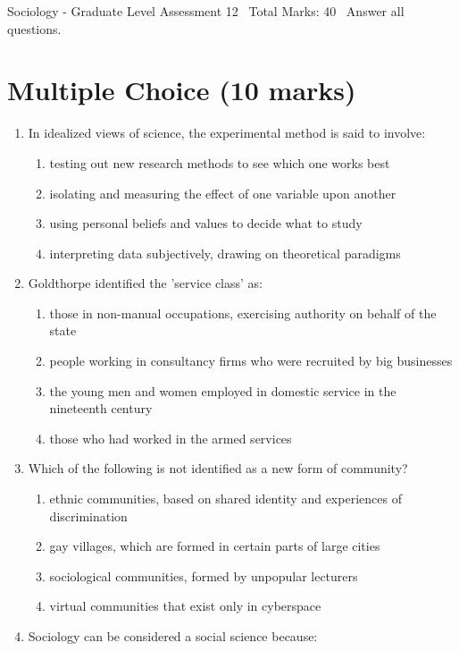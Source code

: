 \documentclass[12pt]{article}
\begin{document}
\begin{center}
Sociology - Graduate Level Assessment 12 \
Total Marks: 40 \
Answer all questions.
\end{center}

\section*{Multiple Choice (10 marks)}
\begin{enumerate}[label=\arabic*.]
\item In idealized views of science, the experimental method is said to involve:
\begin{enumerate}[label=(\alph*)]
    \item testing out new research methods to see which one works best
    \item isolating and measuring the effect of one variable upon another
    \item using personal beliefs and values to decide what to study
    \item interpreting data subjectively, drawing on theoretical paradigms
\end{enumerate}
\item Goldthorpe identified the 'service class' as:
\begin{enumerate}[label=(\alph*)]
    \item those in non-manual occupations, exercising authority on behalf of the state
    \item people working in consultancy firms who were recruited by big businesses
    \item the young men and women employed in domestic service in the nineteenth century
    \item those who had worked in the armed services
\end{enumerate}
\item Which of the following is not identified as a new form of community?
\begin{enumerate}[label=(\alph*)]
    \item ethnic communities, based on shared identity and experiences of discrimination
    \item gay villages, which are formed in certain parts of large cities
    \item sociological communities, formed by unpopular lecturers
    \item virtual communities that exist only in cyberspace
\end{enumerate}
\item Sociology can be considered a social science because:

\end{enumerate}
\end{document}
